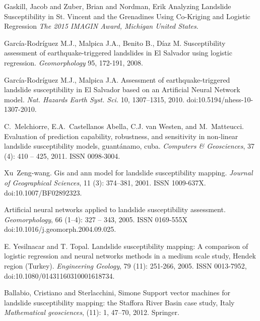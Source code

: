 \documentclass[11pt,twoside]{rmta2010esp}%
\begin{document}
\begin{thebibliography}{99}
Gaskill, Jacob and Zuber, Brian and Nordman, Erik
\newblock Analyzing Landslide Susceptibility in St. Vincent and the Grenadines Using Co-Kriging and Logistic Regression
\newblock \emph{The 2015 IMAGIN Award, Michigan United States}.

  
Garc\'{i}a-Rodr\'{i}guez M.J., Malpica J.A., Benito B., D\'{i}az M.
\newblock  Susceptibility assessment of earthquake-triggered landslides in El Salvador using logistic regression.
\newblock \emph{Geomorphology}
 95, 172-191, 2008. 
  


Garc\'{i}a-Rodr\'{i}guez M.J., Malpica J.A.
\newblock Assessment of earthquake-triggered landslide susceptibility in El Salvador based on an Artificial Neural Network model.
\newblock \emph{Nat. Hazards Earth Syst. Sci.}
 10, 1307–1315, 2010. 
\newblock doi:10.5194/nhess-10-1307-2010.
  

C.~Melchiorre, E.A.~Castellanos Abella, C.J. van Westen, and M.~Matteucci.
\newblock Evaluation of prediction capability, robustness, and sensitivity in
  non-linear landslide susceptibility models, guant\'{a}namo, cuba.
\newblock \emph{Computers {\&} Geosciences}, 37 (4): 410 --
  425, 2011.
\newblock ISSN 0098-3004.


Xu~Zeng-wang.
\newblock Gis and ann model for landslide susceptibility mapping.
\newblock \emph{Journal of Geographical Sciences}, 11 (3):
  374--381, 2001.
\newblock ISSN 1009-637X.
\newblock doi:{10.1007/BF02892323}.


Artificial neural networks applied to landslide susceptibility assessment.
\newblock \emph{Geomorphology}, 66 (1–4): 327 -- 343, 2005.
\newblock ISSN 0169-555X
\newblock doi:10.1016/j.geomorph.2004.09.025.



E. Yesilnacar and T. Topal.
\newblock Landslide susceptibility mapping: A comparison of logistic regression and neural networks methods in a medium scale study, Hendek region (Turkey).
\newblock \emph{Engineering Geology}, 79
  (11): 251-266, 2005.
\newblock ISSN 0013-7952,
\newblock doi:10.1080/01431160310001618734.




Ballabio, Cristiano and Sterlacchini, Simone
\newblock Support vector machines for landslide susceptibility mapping: the Staffora River Basin case study, Italy
\newblock \emph{Mathematical geosciences},
  (11): 1, 47--70, 2012.
\newblock Springer. 




\end{thebibliography}
\end{document}
